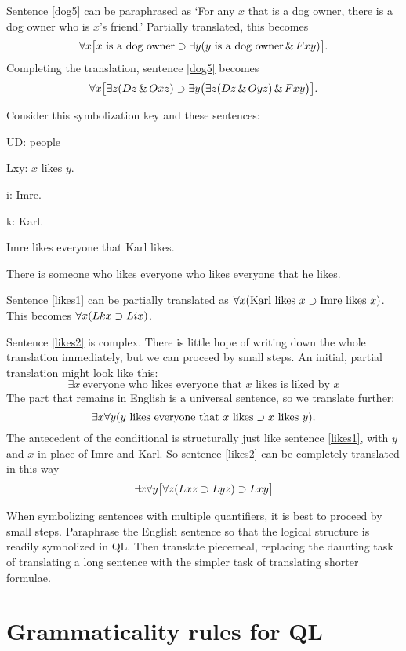 Sentence \ref{dog5} can be paraphrased as `For any $x$ that is a dog owner, there is a dog owner who is $x$'s friend.' Partially translated, this becomes $$\forall x\bigl[\mbox{$x$ is a dog owner}\supset\exists y(\mbox{$y$ is a dog owner}\,\&\, Fxy)\bigr].$$ Completing the translation, sentence \ref{dog5} becomes $$\forall x\bigl[\exists z(Dz \,\&\, Oxz)\supset\exists y\bigl(\exists z(Dz \,\&\, Oyz)\,\&\, Fxy\bigr)\bigr].$$

Consider this symbolization key and these sentences:
\begin{ekey}
\item[UD:] people
\item[Lxy:] $x$ likes $y$.
\item[i:] Imre.
\item[k:] Karl.
\end{ekey}
\begin{earg}
\item[\ex{likes1}]Imre likes everyone that Karl likes.
\item[\ex{likes2}]There is someone who likes everyone who likes everyone that he likes.
\end{earg}

Sentence \ref{likes1} can be partially translated as $\forall x(\mbox{Karl likes $x$}\supset\mbox{Imre likes $x$})$. This becomes $\forall x(Lkx\supset Lix)$.


Sentence \ref{likes2} is complex. There is little hope of writing down the whole translation immediately, but we can proceed by small steps. An initial, partial translation might look like this: $$\exists x\ \mbox{everyone who likes everyone that $x$ likes is liked by $x$}$$
The part that remains in English is a universal sentence, so we translate further: $$\exists x\forall y(\mbox{$y$ likes everyone that $x$ likes}\supset\mbox{$x$ likes $y$}).$$
The antecedent of the conditional is structurally just like sentence \ref{likes1}, with $y$ and $x$ in place of Imre and Karl. So sentence \ref{likes2} can be completely translated in this way $$\exists x\forall y\bigl[\forall z(Lxz \supset Lyz) \supset Lxy\bigr]$$

When symbolizing sentences with multiple quantifiers, it is best to proceed by small steps. Paraphrase the English sentence so that the logical structure is readily symbolized in QL. Then translate piecemeal, replacing the daunting task of translating a long sentence with the simpler task of translating shorter formulae.




\section{Grammaticality rules for QL}


